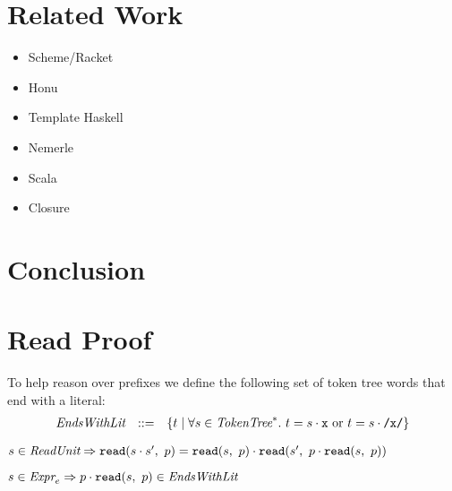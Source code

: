 \documentclass[preprint,10pt]{sigplanconf}
\begin{document}
\section{Related Work}
\label{sec-7}

\begin{itemize}
\item Scheme/Racket
\item Honu
\item Template Haskell
\item Nemerle
\item Scala
\item Closure
\end{itemize}
\section{Conclusion}
\label{sec-8}

\appendix

\section{Read Proof}

To help reason over prefixes we define the following set of token tree
words that end with a literal:
\[
\begin{array}{rcl}
\textit{EndsWithLit} &::=& \{t \mid \forall s \in \textit{TokenTree}^{*}.~t = s \cdot \texttt{x}
~\textrm{or}~ t = s \cdot \texttt{/x/} \}
\end{array}
\]

\begin{lemma}
  \( s \in \textit{ReadUnit} \Rightarrow \texttt{read}(s\cdot s',~p) = 
  \texttt{read}(s,~p) \cdot \texttt{read}(s',~p \cdot \texttt{read}(s,~p))\) 
\end{lemma}

\begin{lemma}
  \( s \in \textit{Expr}_{e} \Rightarrow p \cdot \texttt{read}(s,~p) \in \textit{EndsWithLit} \)
\end{lemma}
\end{document}
